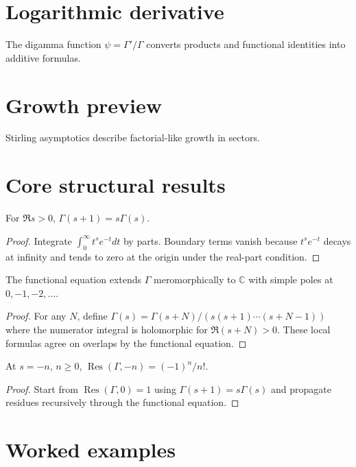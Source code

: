 \section{Logarithmic derivative}
The digamma function $\psi=\Gamma'/\Gamma$ converts products and functional identities into additive formulas.

\section{Growth preview}
Stirling asymptotics describe factorial-like growth in sectors.

\section{Core structural results}

\begin{theorem}\label{thm:iv19-01}
For $\Re s>0$, $\Gamma(s+1)=s\Gamma(s)$.
\begin{proof}
Integrate $\int_0^\infty t^s e^{-t}dt$ by parts. Boundary terms vanish because $t^s e^{-t}$ decays at infinity and tends to zero at the origin under the real-part condition.
\end{proof}
\end{theorem}

\begin{theorem}\label{thm:iv19-02}
The functional equation extends $\Gamma$ meromorphically to $\mathbb C$ with simple poles at $0,-1,-2,\dots$.
\begin{proof}
For any $N$, define $\Gamma(s)=\Gamma(s+N)/(s(s+1)\cdots(s+N-1))$ where the numerator integral is holomorphic for $\Re(s+N)>0$. These local formulas agree on overlaps by the functional equation.
\end{proof}
\end{theorem}

\begin{theorem}\label{thm:iv19-03}
At $s=-n$, $n\ge0$, $\operatorname{Res}(\Gamma,-n)=(-1)^n/n!$.
\begin{proof}
Start from $\operatorname{Res}(\Gamma,0)=1$ using $\Gamma(s+1)=s\Gamma(s)$ and propagate residues recursively through the functional equation.
\end{proof}
\end{theorem}

\section{Worked examples}


